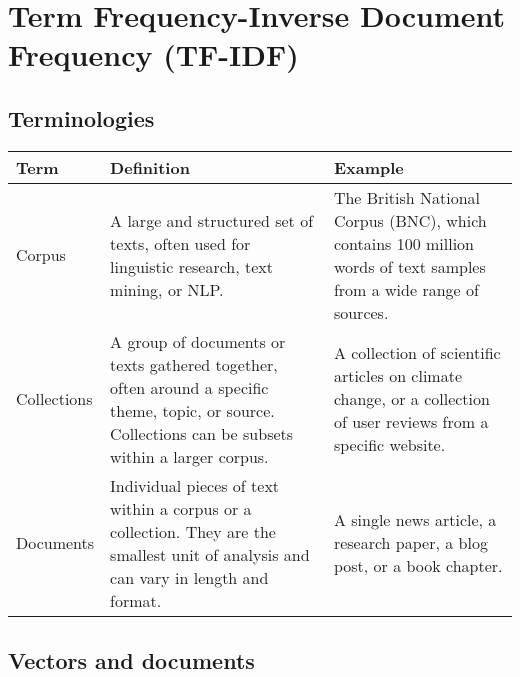 \chapter{Term Frequency-Inverse Document Frequency (TF-IDF) \cite{nlp-1}} \label{Term Frequancy-Inverse Document Frequency (TF-IDF)}


\section{Terminologies \cite{nlp-1, chatgpt}}
\begin{table}[h!]
    \centering
    \begin{tabular}{| m{2   cm} | m{6cm} | m{6cm} |}
        \hline
        \textbf{Term} & \textbf{Definition} & \textbf{Example} \\
        \hline
        Corpus & A large and structured set of texts, often used for linguistic research, text mining, or NLP. & The British National Corpus (BNC), which contains 100 million words of text samples from a wide range of sources. \\
        \hline
        Collections & A group of documents or texts gathered together, often around a specific theme, topic, or source. Collections can be subsets within a larger corpus. & A collection of scientific articles on climate change, or a collection of user reviews from a specific website. \\
        \hline
        Documents & Individual pieces of text within a corpus or a collection. They are the smallest unit of analysis and can vary in length and format. & A single news article, a research paper, a blog post, or a book chapter. \\
        \hline
    \end{tabular}
\end{table}


\section{Vectors and documents \cite{nlp-1}}\label{tf-idf: Vectors and documents}


